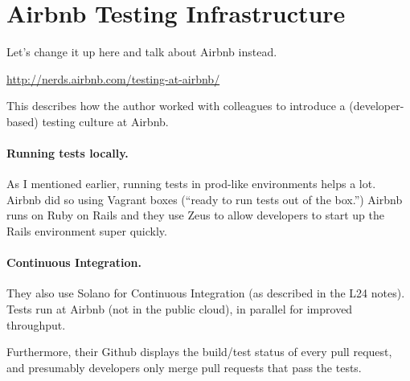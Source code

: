 \documentclass[11pt]{article}
\begin{document}
\section*{Airbnb Testing Infrastructure}

Let's change it up here and talk about Airbnb instead.

\url{http://nerds.airbnb.com/testing-at-airbnb/}

This describes how the author worked with colleagues to introduce a
(developer-based) testing culture at Airbnb.

\paragraph{Running tests locally.} As I mentioned earlier, running tests
in prod-like environments helps a lot. Airbnb did so using Vagrant boxes 
(``ready to run tests out of the box.'') Airbnb runs on Ruby on Rails and 
they use Zeus to allow developers to start up the Rails environment super
quickly.

\paragraph{Continuous Integration.} They also use Solano for Continuous
Integration (as described in the L24 notes). Tests run at Airbnb (not
in the public cloud), in parallel for improved throughput.

Furthermore, their Github displays the build/test status of every pull
request, and presumably developers only merge pull requests that pass
the tests.
\end{document}
